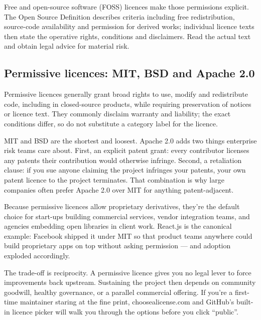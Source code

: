 Free and open-source software (FOSS) licences make those permissions explicit. The Open Source Definition describes criteria including free redistribution, source-code availability and permission for derived works; individual licence texts then state the operative rights, conditions and disclaimers. Read the actual text and obtain legal advice for material risk. \autocite{osi-definition}



\subsection{Permissive licences: MIT, BSD and Apache 2.0}


Permissive licences generally grant broad rights to use, modify and redistribute code, including in closed-source products, while requiring preservation of notices or licence text. They commonly disclaim warranty and liability; the exact conditions differ, so do not substitute a category label for the licence.


MIT and BSD are the shortest and loosest. Apache 2.0 adds two things enterprise risk teams care about. First, an explicit patent grant: every contributor licenses any patents their contribution would otherwise infringe. Second, a retaliation clause: if you sue anyone claiming the project infringes your patents, your own patent licence to the project terminates. That combination is why large companies often prefer Apache 2.0 over MIT for anything patent-adjacent.


Because permissive licences allow proprietary derivatives, they're the default choice for start-ups building commercial services, vendor integration teams, and agencies embedding open libraries in client work. React.js is the canonical example: Facebook shipped it under MIT so that product teams anywhere could build proprietary apps on top without asking permission — and adoption exploded accordingly.


The trade-off is reciprocity. A permissive licence gives you no legal lever to force improvements back upstream. Sustaining the project then depends on community goodwill, healthy governance, or a parallel commercial offering. If you're a first-time maintainer staring at the fine print, choosealicense.com and GitHub's built-in licence picker will walk you through the options before you click ``public''.



